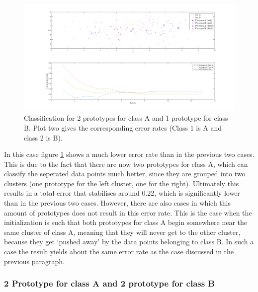 \documentclass[10pt]{article}
\begin{document}
\begin{figure}[H]
 \centering
 \includegraphics[width=\textwidth]{Fig12_c.png}
 \caption{Classification for 2 prototypes for class A and 1 prototype for class B. Plot two gives the corresponding error rates (Class 1 is A and class 2 is B).}
 \label{fig1.12c}
\end{figure}
In this case figure \ref{fig1.12c} shows a much lower error rate than in the previous two cases. This is due to the fact that there are now two prototypes for class A, which can classify the seperated data points much better, since they are grouped into two clusters (one prototype for the left cluster, one for the right). Ultimately this results in a total error that stabilises around 0.22, which is significantly lower than in the previous two cases. However, there are also cases in which this amount of prototypes does not result in this error rate. This is the case when the initialization is such that both prototypes for class A begin somewhere near the same cluster of class A, meaning that they will never get to the other cluster, because they get `pushed away' by the data points belonging to class B. In such a case the result yields about the same error rate as the case discussed in the previous paragraph.

\subsubsection{2 Prototype for class A and 2 prototype for class B}
\end{document}
